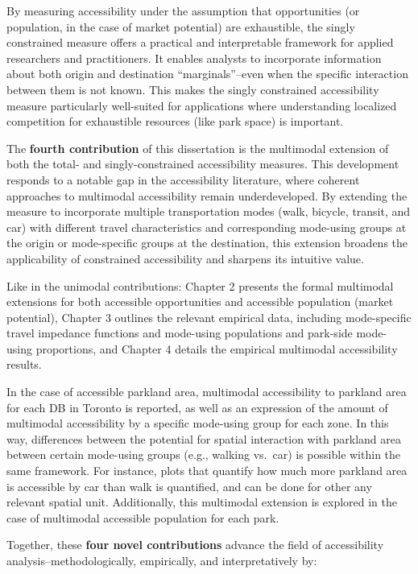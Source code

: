 \documentclass[
11pt, %
oneside, %
english, %
singlespacing, %
]{macthesis} %
\begin{document}
By measuring accessibility under the assumption that opportunities (or population, in the case of market potential) are exhaustible, the singly constrained measure offers a practical and interpretable framework for applied researchers and practitioners. It enables analysts to incorporate information about both origin and destination ``marginals''--even when the specific interaction between them is not known. This makes the singly constrained accessibility measure particularly well-suited for applications where understanding localized competition for exhaustible resources (like park space) is important.

The \textbf{fourth contribution} of this dissertation is the multimodal extension of both the total- and singly-constrained accessibility measures. This development responds to a notable gap in the accessibility literature, where coherent approaches to multimodal accessibility remain underdeveloped. By extending the measure to incorporate multiple transportation modes (walk, bicycle, transit, and car) with different travel characteristics and corresponding mode-using groups at the origin or mode-specific groups at the destination, this extension broadens the applicability of constrained accessibility and sharpens its intuitive value.

Like in the unimodal contributions: Chapter 2 presents the formal multimodal extensions for both accessible opportunities and accessible population (market potential), Chapter 3 outlines the relevant empirical data, including mode-specific travel impedance functions and mode-using populations and park-side mode-using proportions, and Chapter 4 details the empirical multimodal accessibility results.

In the case of accessible parkland area, multimodal accessibility to parkland area for each DB in Toronto is reported, as well as an expression of the amount of multimodal accessibility by a specific mode-using group for each zone. In this way, differences between the potential for spatial interaction with parkland area between certain mode-using groups (e.g., walking vs.~car) is possible within the same framework. For instance, plots that quantify how much more parkland area is accessible by car than walk is quantified, and can be done for other any relevant spatial unit. Additionally, this multimodal extension is explored in the case of multimodal accessible population for each park.

Together, these \textbf{four novel contributions} advance the field of accessibility analysis--methodologically, empirically, and interpretatively by:
\end{document}
